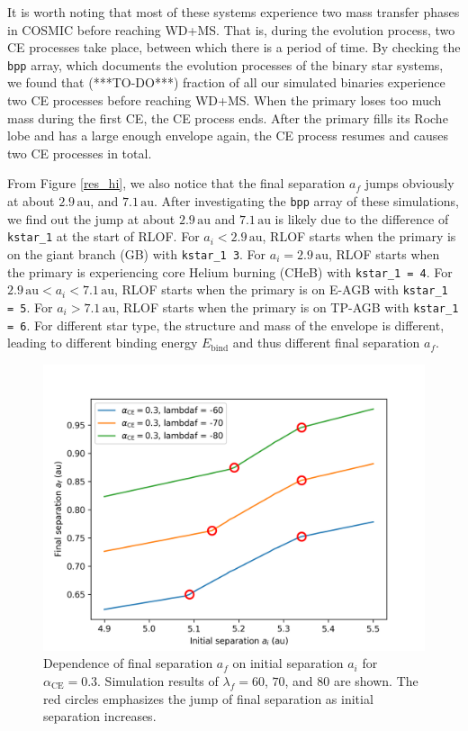\documentclass[linenumbers]{aastex631}
\newcommand{\alphace}{\alpha_{\mathrm{CE}}}
\newcommand{\Ebind}{E_{\mathrm{bind}}}
\newcommand{\au}{\, \mathrm{au}}
\begin{document}
It is worth noting that most of these systems experience two mass transfer phases in COSMIC before reaching WD+MS. That is, during the evolution process, two CE processes take place, between which there is a period of time. By checking the \verb|bpp| array, which documents the evolution processes of the binary star systems, we found that (***TO-DO***) fraction of all our simulated binaries experience two CE processes before reaching WD+MS. When the primary loses too much mass during the first CE, the CE process ends. After the primary fills its Roche lobe and has a large enough envelope again, the CE process resumes and causes two CE processes in total.

From Figure \ref{res_hi}, we also notice that the final separation $a_f$ jumps obviously at about $2.9 \au$, and $7.1 \au$. After investigating the \verb|bpp| array of these simulations, we find out the jump at about $2.9 \au$ and $7.1 \au$ is likely due to the difference of \verb|kstar_1| at the start of RLOF. For $a_i < 2.9 \au$, RLOF starts when the primary is on the giant branch (GB) with \verb|kstar_1 3|. For $a_i = 2.9 \au$, RLOF starts when the primary is experiencing core Helium burning (CHeB) with \verb|kstar_1 = 4|. For $2.9 \au < a_i < 7.1 \au$, RLOF starts when the primary is on E-AGB with \verb|kstar_1 = 5|. For $a_i > 7.1 \au$, RLOF starts when the primary is on TP-AGB with \verb|kstar_1 = 6|. For different star type, the structure and mass of the envelope is different, leading to different binding energy $\Ebind$ and thus different final separation $a_f$.

\begin{figure}
	\centering
	\includegraphics[width = 0.5\linewidth]{jump-zoom.png}
	\caption{Dependence of final separation $a_f$ on initial separation $a_i$ for $\alphace = 0.3$. Simulation results of $\lambda_f = 60$, $70$, and $80$ are shown. The red circles emphasizes the jump of final separation as initial separation increases.}
	\label{jump-zoom}
\end{figure}
\end{document}
